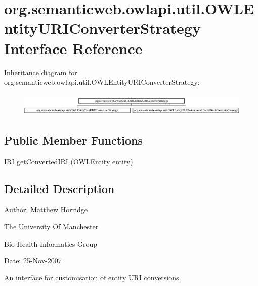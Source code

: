 \hypertarget{interfaceorg_1_1semanticweb_1_1owlapi_1_1util_1_1_o_w_l_entity_u_r_i_converter_strategy}{\section{org.\-semanticweb.\-owlapi.\-util.\-O\-W\-L\-Entity\-U\-R\-I\-Converter\-Strategy Interface Reference}
\label{interfaceorg_1_1semanticweb_1_1owlapi_1_1util_1_1_o_w_l_entity_u_r_i_converter_strategy}
}
Inheritance diagram for org.\-semanticweb.\-owlapi.\-util.\-O\-W\-L\-Entity\-U\-R\-I\-Converter\-Strategy\-:\begin{figure}[H]
\begin{center}
\leavevmode
\includegraphics[height=1.113320cm]{interfaceorg_1_1semanticweb_1_1owlapi_1_1util_1_1_o_w_l_entity_u_r_i_converter_strategy}
\end{center}
\end{figure}
\subsection*{Public Member Functions}
\begin{DoxyCompactItemize}
\item 
\hyperlink{classorg_1_1semanticweb_1_1owlapi_1_1model_1_1_i_r_i}{I\-R\-I} \hyperlink{interfaceorg_1_1semanticweb_1_1owlapi_1_1util_1_1_o_w_l_entity_u_r_i_converter_strategy_adf772b5cc968b9a42b890707479a38a8}{get\-Converted\-I\-R\-I} (\hyperlink{interfaceorg_1_1semanticweb_1_1owlapi_1_1model_1_1_o_w_l_entity}{O\-W\-L\-Entity} entity)
\end{DoxyCompactItemize}


\subsection{Detailed Description}
Author\-: Matthew Horridge\par
 The University Of Manchester\par
 Bio-\/\-Health Informatics Group\par
 Date\-: 25-\/\-Nov-\/2007\par
\par
 An interface for customisation of entity U\-R\-I conversions. 

